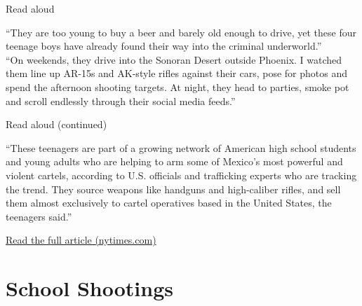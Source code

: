 \documentclass[aspectratio=169,11pt]{beamer}
\begin{document}
\begin{frame}{Read aloud}
  \vspace{0.5em}
  \begin{textquote}[fontupper=\itshape\small]
    ``They are too young to buy a beer and barely old enough to drive, yet these four teenage boys have already found their way into the criminal underworld.''\\[0.6em]
    ``On weekends, they drive into the Sonoran Desert outside Phoenix. I watched them line up AR-15s and AK-style rifles against their cars, pose for photos and spend the afternoon shooting targets. At night, they head to parties, smoke pot and scroll endlessly through their social media feeds.''
  \end{textquote}
\end{frame}

\begin{frame}{Read aloud (continued)}
  \vspace{0.5em}
  \begin{textquote}[fontupper=\itshape\small]
    ``These teenagers are part of a growing network of American high school students and young adults who are helping to arm some of Mexico's most powerful and violent cartels, according to U.S. officials and trafficking experts who are tracking the trend. They source weapons like handguns and high-caliber rifles, and sell them almost exclusively to cartel operatives based in the United States, the teenagers said.''
  \end{textquote}
  \vfill
  {\scriptsize \href{https://www.nytimes.com/2026/10/03/world/americas/high-school-arms-dealing-mexican-cartels.html?unlocked_article_code=1.NlE.5_Cb.QnFkDBJKkBMg&smid=url-share}{Read the full article (nytimes.com)}\par}
  \vspace{0.6em}
\end{frame}

\section{School Shootings}
\end{document}
